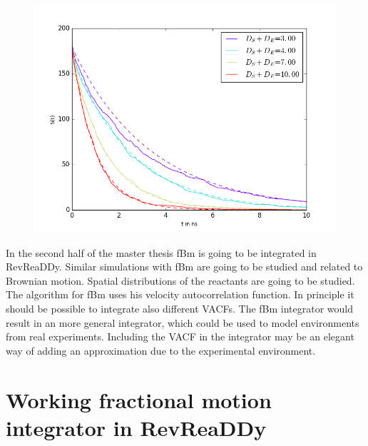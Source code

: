 \documentclass[
  a4paper,BCOR10mm,oneside,
  bibtotoc,idxtotoc,
  headsepline,footsepline,%
  fleqn,openbib
]{scrbook}
\begin{document}
\begin{figure}[h!]
  \centering
  \includegraphics[width=\linewidth]{./data/besta.png}
  \captionsetup{width=0.9\linewidth}
  \label{fig:reactionssimulation}
\end{figure}
\newline \noindent In the second half of the master thesis fBm is going to be integrated in RevReaDDy. Similar simulations with fBm are going to be studied and related to Brownian motion. Spatial distributions of the reactants are going to be studied. The algorithm for fBm uses his velocity autocorrelation function. In principle it should be possible to integrate also different VACFs. The fBm integrator would result in an more general integrator, which could be used to model environments from real experiments. Including the VACF in the integrator may be an elegant way of adding an approximation due to the experimental environment. 

\chapter{Working  fractional motion integrator in RevReaDDy}
\end{document}
